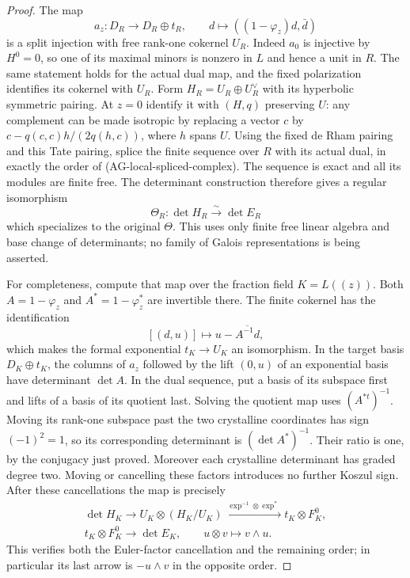 \begin{proof}
The map
\[
 a_z:D_R\longrightarrow D_R\oplus t_R,
       \qquad d\longmapsto((1-\varphi_z)d,\bar d)
\]
is a split injection with free rank-one cokernel $U_R$.
Indeed $a_0$ is injective by $H^0=0$, so one of its
maximal minors is nonzero in $L$ and hence a unit in
$R$.  The same statement holds for the actual dual
map, and the fixed polarization identifies its
cokernel with $U_R$.  Form
$H_R=U_R\oplus U_R^\vee$ with its hyperbolic symmetric
pairing.  At $z=0$ identify it with $(H,q)$ preserving
$U$: any complement can be made isotropic by replacing
a vector $c$ by
$c-q(c,c)h/(2q(h,c))$, where $h$ spans $U$.
Using the fixed de Rham pairing and this Tate pairing,
splice the finite sequence over $R$ with its actual
dual, in exactly the order of
(AG-local-spliced-complex).  The sequence is exact and
all its modules are finite free.  The determinant
construction therefore gives a regular isomorphism
\[
                   \Theta_R:\det H_R\xrightarrow{\sim}\det E_R
\]
which specializes to the original $\Theta$.  This uses
only finite free linear algebra and base change of
determinants; no family of Galois representations is
being asserted.

For completeness, compute that map over the fraction
field $K=L((z))$.  Both $A=1-\varphi_z$ and
$A^*=1-\varphi_z^*$ are invertible there.  The finite
cokernel has the identification
\[
 [(d,u)]\longmapsto u-\overline{A^{-1}d},
\]
which makes the formal exponential $t_K\to U_K$ an
isomorphism.  In the target basis $D_K\oplus t_K$,
the columns of $a_z$ followed by the lift $(0,u)$ of
an exponential basis have determinant $\det A$.
In the dual sequence, put a basis of its subspace
first and lifts of a basis of its quotient last.
Solving the quotient map uses $(A^{*t})^{-1}$.
Moving its rank-one subspace past the two crystalline
coordinates has sign $(-1)^2=1$, so its corresponding
determinant is $(\det A^*)^{-1}$.
Their ratio is one, by the conjugacy just proved.
Moreover each crystalline determinant has graded
degree two.  Moving or cancelling these factors
introduces no further Koszul sign.  After these
cancellations the map is precisely
\[
 \begin{gathered}
 \det H_K\longrightarrow U_K\otimes(H_K/U_K)
 \xrightarrow{\ \exp^{-1}\otimes\exp^*\ }
 t_K\otimes F^0_K,\\
 t_K\otimes F^0_K\longrightarrow\det E_K,
       \qquad u\otimes v\longmapsto v\wedge u.
 \end{gathered}
\tag{AG-local-generic-splice}
\]
This verifies both the Euler-factor cancellation and
the remaining order; in particular its last arrow
is $-u\wedge v$ in the opposite order.


\end{proof}
